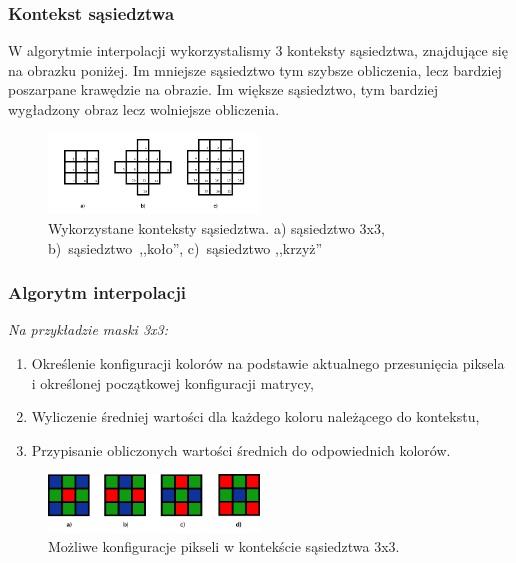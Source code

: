 \documentclass{beamer}
\begin{document}
\begin{frame}
	\frametitle{Kontekst sąsiedztwa}
	
	W algorytmie interpolacji wykorzystalismy 3 konteksty sąsiedztwa, znajdujące się na obrazku poniżej. Im mniejsze sąsiedztwo tym szybsze obliczenia, lecz bardziej poszarpane krawędzie na obrazie. Im większe sąsiedztwo, tym bardziej wygładzony obraz lecz wolniejsze obliczenia.
	
  \begin{figure}
  \includegraphics[width=0.5\textwidth]{masks}
  \caption{Wykorzystane konteksty sąsiedztwa. a) sąsiedztwo 3x3, b)~sąsiedztwo~,,koło'',
  c)~sąsiedztwo ,,krzyż''}
  \label{fig:masks}
  \end{figure}
\end{frame}

\begin{frame}
  \frametitle{Algorytm interpolacji}
  \emph{Na przykładzie maski 3x3:}
  
  \begin{enumerate}
    \item Określenie konfiguracji kolorów na podstawie aktualnego przesunięcia piksela i określonej
      początkowej konfiguracji matrycy,
    \item Wyliczenie średniej wartości dla każdego koloru należącego do kontekstu,
    \item Przypisanie obliczonych wartości średnich do odpowiednich kolorów.
  \end{enumerate}
  
  \begin{figure}
  \includegraphics[width=0.5\textwidth]{mask3conf}
  \caption{Możliwe konfiguracje pikseli w kontekście sąsiedztwa 3x3.}
  \label{fig:masks}
  \end{figure}
  
\end{frame}
\end{document}
